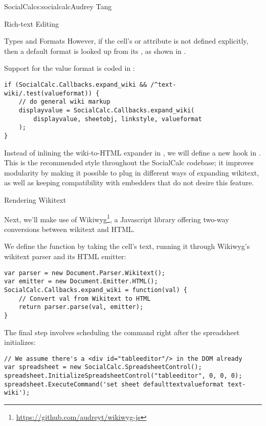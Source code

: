 \begin{aosachapter}{SocialCalc}{s:socialcalc}{Audrey Tang}
\begin{aosasect1}{Rich-text Editing}
\begin{aosasect2}{Types and Formats}
However, if the cell's  or
 attribute is not defined explicitly, then a
default format is looked up from its , as shown in
.



\noindent Support for the  value format is coded in
:

\begin{verbatim}
if (SocialCalc.Callbacks.expand_wiki && /^text-wiki/.test(valueformat)) {
    // do general wiki markup
    displayvalue = SocialCalc.Callbacks.expand_wiki(
        displayvalue, sheetobj, linkstyle, valueformat
    );
}
\end{verbatim}

Instead of inlining the wiki-to-HTML expander in
, we will define a new hook in
.  This is the recommended style
throughout the SocialCalc codebase; it improves modularity by making
it possible to plug in different ways of expanding wikitext, as well
as keeping compatibility with embedders that do not desire this
feature.

\end{aosasect2}

\begin{aosasect2}{Rendering Wikitext}

Next, we'll make use of
Wikiwyg\footnote{\url{https://github.com/audreyt/wikiwyg-js}}, a
Javascript library offering two-way conversions between wikitext and
HTML.

We define the  function by taking the cell's text,
running it through Wikiwyg's wikitext parser and its HTML emitter:

\begin{verbatim}
var parser = new Document.Parser.Wikitext();
var emitter = new Document.Emitter.HTML();
SocialCalc.Callbacks.expand_wiki = function(val) {
    // Convert val from Wikitext to HTML
    return parser.parse(val, emitter);
}
\end{verbatim}

\pagebreak 
\noindent The final step involves scheduling the  command right after the
spreadsheet initializes:


\begin{verbatim}
// We assume there's a <div id="tableeditor"/> in the DOM already
var spreadsheet = new SocialCalc.SpreadsheetControl();
spreadsheet.InitializeSpreadsheetControl("tableeditor", 0, 0, 0);
spreadsheet.ExecuteCommand('set sheet defaulttextvalueformat text-wiki');
\end{verbatim}


\end{aosasect2}
\end{aosasect1}
\end{aosachapter}

